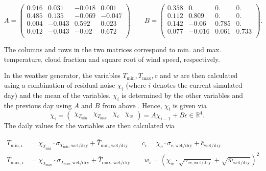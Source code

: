 \begin{refsection}
\begin{equation}
A = \left( \begin{matrix}
0.916 & 0.031 & -0.018 & 0.001\\
0.485 & 0.135 & -0.069 & -0.047\\
0.004 & -0.043 & 0.592 & 0.023\\
0.012 & -0.043 & -0.02 & 0.672\\
\end{matrix} \right)
\qquad
B = \left( \begin{matrix}
0.358 & 0. & 0. & 0.\\
0.112 & 0.809 & 0. & 0.\\
0.142 & -0.06 & 0.785 & 0.\\
0.077 & -0.016 & 0.061 & 0.733\\
\end{matrix} \right) \label{eq:AB}.
\end{equation}

The columns and rows in the two matrices correspond to min. and max. temperature, cloud fraction and square root of wind speed, respectively.

In the weather generator, the variables $T_\mathrm{min}, T_\mathrm{max}, c$ and $w$ are then calculated using a combination of residual noise $\chi_i$ (where $i$ denotes the current simulated day) and the mean of the variables. $\chi_i$ is determined by the other variables and the previous day using $A$ and $B$ from above \citep{Richardson1981,Matalas1967}. Hence, $\chi_i$ is given via
\begin{equation}
\chi_i = 
\begin{pmatrix} 
\chi_{T_\mathrm{min}} & \chi_{T_\mathrm{max}} & \chi_c & \chi_w
\end{pmatrix} = A\chi_{i-1} + B\epsilon \in \mathbb{R}^4.
\end{equation}
The daily values for the variables are then calculated via

\begin{align}
T_{\mathrm{min},i} &= \chi_{T_\mathrm{min}} \cdot \sigma_{T_\mathrm{min},\mathrm{wet/dry}} + \bar{T}_{\mathrm{min}, \mathrm{wet/dry}} \qquad c_{i} = \chi_{c} \cdot \sigma_{c,\mathrm{wet/dry}} + \bar{c}_{\mathrm{wet/dry}} \\
T_{\mathrm{max},i} &= \chi_{T_\mathrm{max}} \cdot \sigma_{T_\mathrm{max},\mathrm{wet/dry}} + \bar{T}_{\mathrm{max}, \mathrm{wet/dry}} \qquad w_{i} = \left(\chi_{w} \cdot \sqrt{\sigma_{w,\mathrm{wet/dry}}} + \sqrt{\bar{w}_\mathrm{wet/dry}}\right)^2
\end{align}


\end{refsection}
